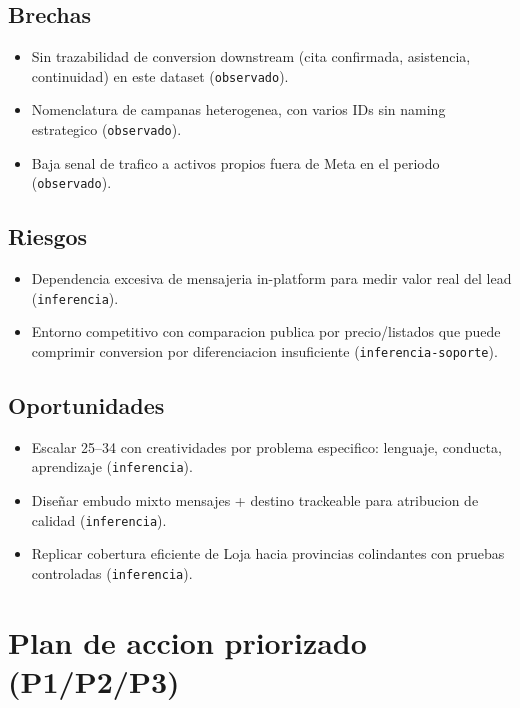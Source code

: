 \documentclass[9pt,a4paper,twocolumn,twoside]{tau-class/tau}
\begin{document}
\subsection{Brechas}
\begin{itemize}
  \item Sin trazabilidad de conversion downstream (cita confirmada, asistencia, continuidad) en este dataset (\texttt{observado}).
  \item Nomenclatura de campanas heterogenea, con varios IDs sin naming estrategico (\texttt{observado}).
  \item Baja senal de trafico a activos propios fuera de Meta en el periodo (\texttt{observado}).
\end{itemize}

\subsection{Riesgos}
\begin{itemize}
  \item Dependencia excesiva de mensajeria in-platform para medir valor real del lead (\texttt{inferencia}).
  \item Entorno competitivo con comparacion publica por precio/listados que puede comprimir conversion por diferenciacion insuficiente (\texttt{inferencia-soporte}).
\end{itemize}

\subsection{Oportunidades}
\begin{itemize}
  \item Escalar 25--34 con creatividades por problema especifico: lenguaje, conducta, aprendizaje (\texttt{inferencia}).
  \item Diseñar embudo mixto mensajes + destino trackeable para atribucion de calidad (\texttt{inferencia}).
  \item Replicar cobertura eficiente de Loja hacia provincias colindantes con pruebas controladas (\texttt{inferencia}).
\end{itemize}

\section{Plan de accion priorizado (P1/P2/P3)}
\end{document}
